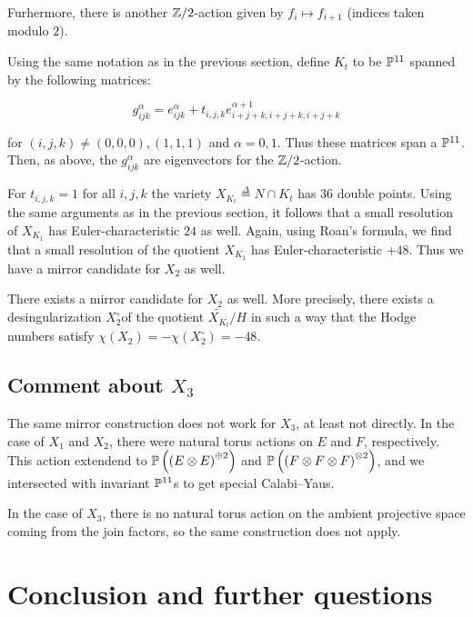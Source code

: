 Furhermore, there is another $\Z/2$-action given by $f_i \mapsto f_{i+1}$ (indices taken modulo $2$).

Using the same notation as in the previous section, define $K_t$ to be $\P^{11}$ 
spanned by the following matrices:

\begin{equation}
\label{eq:gijk}
g_{ijk}^\alpha = e_{ijk}^\alpha + t_{i,j,k} e_{i+j+k,i+j+k,i+j+k}^{\alpha+1}
\end{equation}

for $(i,j,k)\neq (0,0,0),(1,1,1)$ and $\alpha=0,1$. Thus these matrices span a $\P^{11}$. Then, as above, the $g_{ijk}^\alpha$ are eigenvectors for the $\Z/2$-action.

For $t_{i,j,k}=1$ for all $i,j,k$ the variety $X_{K_t} \stackrel \Delta =  N \cap K_t$ has $36$ double points. Using the same arguments as in the previous section, it follows that a small resolution of $X_{K_1}$ has Euler-characteristic $24$ as well. Again, using Roan's formula, we find that a small resolution of the quotient $X_{K_1}$ has Euler-characteristic $+48$. Thus we have a mirror candidate for $X_2$ as well.

\begin{proposition}
There exists a mirror candidate for $X_2$ as well. More precisely, there exists a \CY desingularization $X_2^\circ $of the quotient $\widetilde {X_{K_t}}/H$ in such a way that the Hodge numbers satisfy $\chi(X_2) = -\chi(X_2^\circ) = -48$.
\end{proposition}

\subsection{Comment about $X_3$}

The same mirror construction does not work for $X_3$, at least not directly. In the case of $X_1$ and $X_2$, there were natural torus actions on $E$ and $F$,  respectively. This action extendend to $\P\left(\left( E \otimes E\right)^{\oplus 2}\right)$ and $\P\left(\left(F \otimes F \otimes F\right)^{\otimes 2}\right)$, and we intersected with invariant $\P^{11}$s to get special Calabi--Yaus.

In the case of $X_3$, there is no natural torus action on the ambient projective space coming from the join factors, so the same construction does not apply.

\section{Conclusion and further questions}

